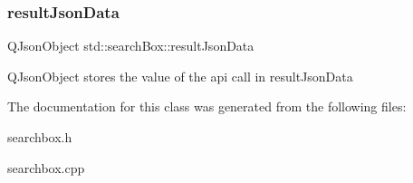 \subsubsection{\texorpdfstring{result\+Json\+Data}{resultJsonData}}
{\footnotesize\ttfamily Q\+Json\+Object std\+::search\+Box\+::result\+Json\+Data\hspace{0.3cm}{\ttfamily [private]}}

Q\+Json\+Object stores the value of the api call in result\+Json\+Data 

The documentation for this class was generated from the following files\+:\begin{DoxyCompactItemize}
\item 
searchbox.\+h\item 
searchbox.\+cpp\end{DoxyCompactItemize}

